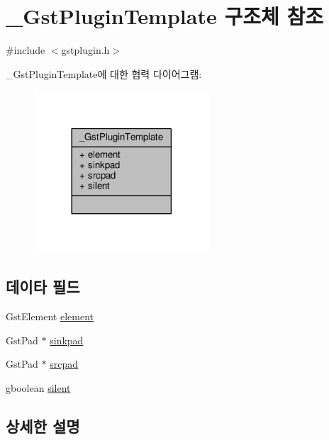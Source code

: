 \hypertarget{struct___gst_plugin_template}{}\section{\+\_\+\+Gst\+Plugin\+Template 구조체 참조}
\label{struct___gst_plugin_template}


{\ttfamily \#include $<$gstplugin.\+h$>$}



\+\_\+\+Gst\+Plugin\+Template에 대한 협력 다이어그램\+:
\nopagebreak
\begin{figure}[H]
\begin{center}
\leavevmode
\includegraphics[width=185pt]{struct___gst_plugin_template__coll__graph}
\end{center}
\end{figure}
\subsection*{데이타 필드}
\begin{DoxyCompactItemize}
\item 
Gst\+Element \hyperlink{struct___gst_plugin_template_aa44175fd50974e0b9b5a86e52a735c5c}{element}
\item 
Gst\+Pad $\ast$ \hyperlink{struct___gst_plugin_template_a0cd494edebad1c57835d375e95523c15}{sinkpad}
\item 
Gst\+Pad $\ast$ \hyperlink{struct___gst_plugin_template_a36baa2d004e6d2d99d965e46bc41e1a9}{srcpad}
\item 
gboolean \hyperlink{struct___gst_plugin_template_a0003b52c71453f2f020b1df5e8c40723}{silent}
\end{DoxyCompactItemize}


\subsection{상세한 설명}



